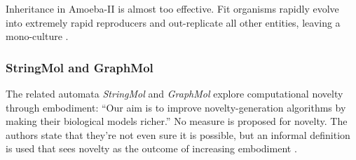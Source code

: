 Inheritance in Amoeba-II is almost too effective. Fit organisms rapidly evolve into extremely rapid reproducers and out-replicate all other entities, leaving a mono-culture \parencite{Pargellis2001}.

%
%
%
%
\subsubsection{StringMol and GraphMol}

The related automata \emph{StringMol} \parencite{Hickinbotham2011} and \emph{GraphMol} \parencite{Nellis2012, Nellis2014} explore computational novelty through embodiment: ``Our aim is to improve novelty-generation algorithms by making their biological models richer.'' No measure is proposed for novelty. The authors state that they're not even sure it is possible, but an informal definition is used that sees novelty as the outcome of increasing embodiment \parencite[p.87]{Nellis2012}.

